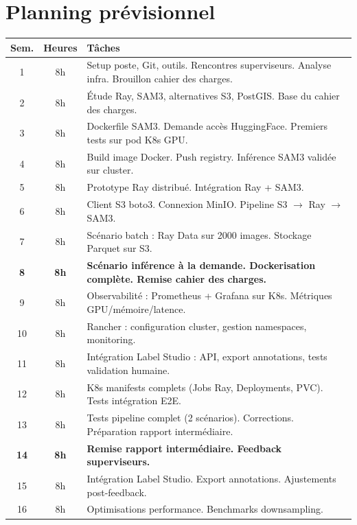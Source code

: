 \section{Planning prévisionnel}

\begin{table}[H]
\centering
\begin{tabular}{|c|c|p{9cm}|}
\hline
\textbf{Sem.} & \textbf{Heures} & \textbf{Tâches} \\
\hline
1  & 8h  & Setup poste, Git, outils. Rencontres superviseurs. Analyse infra. Brouillon cahier des charges. \\
\hline
2  & 8h  & Étude Ray, SAM3, alternatives S3, PostGIS. Base du cahier des charges. \\
\hline
3  & 8h  & Dockerfile SAM3. Demande accès HuggingFace. Premiers tests sur pod K8s GPU. \\
\hline
4  & 8h  & Build image Docker. Push registry. Inférence SAM3 validée sur cluster. \\
\hline
5  & 8h  & Prototype Ray distribué. Intégration Ray + SAM3. \\
\hline
6  & 8h  & Client S3 boto3. Connexion MinIO. Pipeline S3 $\rightarrow$ Ray $\rightarrow$ SAM3. \\
\hline
7  & 8h  & Scénario batch : Ray Data sur 2000 images. Stockage Parquet sur S3. \\
\hline
\textbf{8}  & \textbf{8h}  & \textbf{Scénario inférence à la demande. Dockerisation complète. Remise cahier des charges.} \\
\hline
9  & 8h  & Observabilité : Prometheus + Grafana sur K8s. Métriques GPU/mémoire/latence. \\
\hline
10 & 8h  & Rancher : configuration cluster, gestion namespaces, monitoring. \\
\hline
11 & 8h  & Intégration Label Studio : API, export annotations, tests validation humaine. \\
\hline
12 & 8h  & K8s manifests complets (Jobs Ray, Deployments, PVC). Tests intégration E2E. \\
\hline
13 & 8h  & Tests pipeline complet (2 scénarios). Corrections. Préparation rapport intermédiaire. \\
\hline
\textbf{14} & \textbf{8h}  & \textbf{Remise rapport intermédiaire. Feedback superviseurs.} \\
\hline
15 & 8h  & Intégration Label Studio. Export annotations. Ajustements post-feedback. \\
\hline
16 & 8h  & Optimisations performance. Benchmarks downsampling. \\

\end{tabular}
\end{table}

